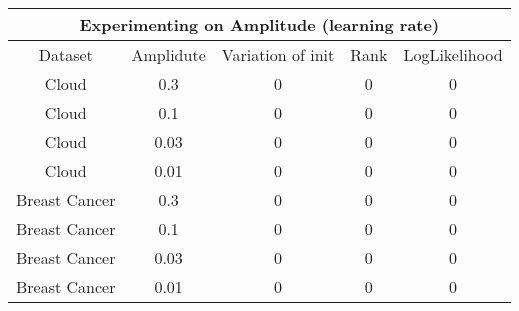 \documentclass[a4paper]{article}
\begin{document}
\begin{center}
    \begin{tabular}{||c c c c c||} 
     \hline
     \multicolumn{5}{|c|}{Experimenting on Amplitude (learning rate)} \\
     \hline
     Dataset & Amplidute & Variation of init & Rank & LogLikelihood \\ [0.5ex] 
     \hline\hline
     Cloud & 0.3 & 0 & 0 & 0 \\
     \hline
     Cloud & 0.1 & 0 & 0 & 0 \\ 
     \hline
     Cloud & 0.03 & 0 & 0 & 0 \\ 
     \hline
     Cloud & 0.01 & 0 & 0 & 0 \\ 
     \hline
     Breast Cancer & 0.3 & 0 & 0 & 0 \\
     \hline
     Breast Cancer & 0.1 & 0 & 0 & 0 \\ 
     \hline
     Breast Cancer & 0.03 & 0 & 0 & 0 \\ 
     \hline
     Breast Cancer & 0.01 & 0 & 0 & 0 \\ [1ex] 
     \hline
    \end{tabular}
\end{center}



\end{document}
